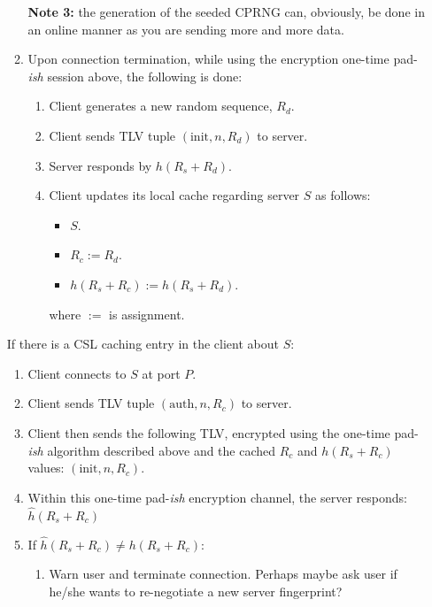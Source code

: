 \documentclass{article}
\begin{document}
\begin{enumerate}
\begin{enumerate}
            \textbf{Note 3:} the generation of the seeded CPRNG can, obviously,
            be done in an online manner as you are sending more and more data.
            \item Upon connection termination, while using the encryption
            one-time pad-\emph{ish} session above, the following is done:
                \begin{enumerate}
                    \item Client generates a new random sequence, $R_d$.
                    \item Client sends TLV tuple $(\text{init}, n, R_d)$ to
                    server.
                    \item Server responds by $h(R_s + R_d)$.
                    \item Client updates its local cache regarding server $S$
                    as follows:
                        \begin{itemize}
                            \item $S$.
                            \item $R_c := R_d$.
                            \item $h(R_s + R_c) := h(R_s + R_d)$.
                        \end{itemize}
                        where $:=$ is assignment.
                \end{enumerate}
        \end{enumerate}
    If there is a CSL caching entry in the client about $S$:
    \begin{enumerate}
        \item Client connects to $S$ at port $P$.
        \item Client sends TLV tuple $(\text{auth}, n, R_c)$ to server.
        \item Client then sends the following TLV, encrypted using the
        one-time pad-\emph{ish} algorithm described above and the cached $R_c$
        and $h(R_s + R_c)$ values: $(\text{init}, n, R_c)$.
        \item Within this one-time pad-\emph{ish} encryption channel, the
        server responds: $\hat h(R_s + R_c)$
        \item If $\hat h(R_s + R_c) \ne h(R_s + R_c)$:
            \begin{enumerate}
                \item Warn user and terminate connection. Perhaps maybe ask
                user if he/she wants to re-negotiate a new server fingerprint?

\end{enumerate}
\end{enumerate}
\end{enumerate}
\end{document}
